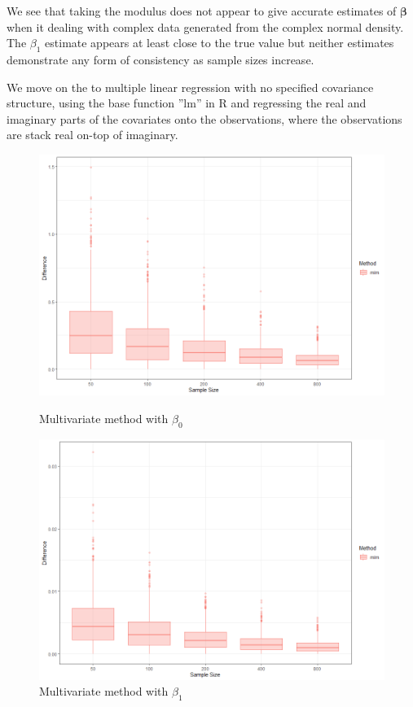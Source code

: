 \documentclass[honours,12pt]{unswthesis}
\numberwithin{equation}{section}
\begin{document}
\noindent We see that taking the modulus does not appear to give accurate estimates of $\bm{\beta}$ when it dealing with complex data generated from the complex normal density. The $\beta_{1}$ estimate appears at least close to the true value but neither estimates demonstrate any form of consistency as sample sizes increase.\par

We move on the to multiple linear regression with no specified covariance structure, using the base function ''lm'' in R and regressing the real and imaginary parts of the covariates onto the observations, where the observations are stack real on-top of imaginary.

\begin{figure}[hpb]
    \centering
    \begin{minipage}{0.5\textwidth}
        \centering
        \includegraphics[width=\textwidth]{graphics/b0_mlm}
        \caption{Multivariate method with $\beta_{0}$}
    \end{minipage}\hfill
    \begin{minipage}{0.5\textwidth}
        \centering
        \includegraphics[width=\textwidth]{graphics/b1_mlm} 
        \caption{Multivariate method with $\beta_{1}$}
    \end{minipage}
\end{figure}
\end{document}
